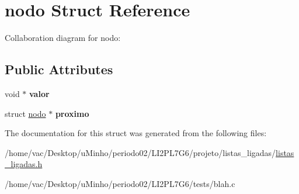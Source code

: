 \hypertarget{structnodo}{}\section{nodo Struct Reference}
\label{structnodo}


Collaboration diagram for nodo\+:
\subsection*{Public Attributes}
\begin{DoxyCompactItemize}
\item 
\mbox{\label{structnodo_a344b5b1cb9597ce38786e9d21bb6f42d}} 
void $\ast$ {\bfseries valor}
\item 
\mbox{\label{structnodo_a89841e92650be541e8bc568a20765e82}} 
struct \hyperlink{structnodo}{nodo} $\ast$ {\bfseries proximo}
\end{DoxyCompactItemize}


The documentation for this struct was generated from the following files\+:\begin{DoxyCompactItemize}
\item 
/home/vac/\+Desktop/u\+Minho/periodo02/\+L\+I2\+P\+L7\+G6/projeto/listas\+\_\+ligadas/\hyperlink{listas__ligadas_8h}{listas\+\_\+ligadas.\+h}\item 
/home/vac/\+Desktop/u\+Minho/periodo02/\+L\+I2\+P\+L7\+G6/tests/blah.\+c\end{DoxyCompactItemize}
